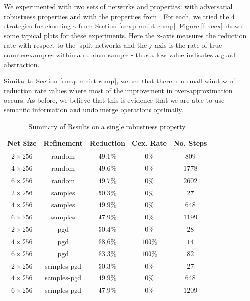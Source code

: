 We experimented with two sets of networks and properties: \mnist with
adversarial robustness properties and \acasxu with the properties from
\cite{reluplex}. For each, we tried the 4 strategies for choosing $\gamma$ from
Section \ref{s:exp-mnist-comp}.
Figure \ref{f:ncex} shows some typical plots
for these experiments. Here the x-axis measures the reduction rate with respect
to the \inc-\dec split networks and the y-axis is the rate of true
counterexamples within a random sample - thus a low value indicates a good
abstraction.

Similar to Section \ref{s:exp-mnist-comp}, we see that there is a small window
of reduction rate values where most of the improvement in over-approximation
occurs. As before, we believe that this is evidence that we are able to use
semantic information and undo merge operations optimally.

\begin{table}
\begin{tabular}{|c|c|c|c|c|}
    \hline
    Net Size     & Refinement  & Reduction & Cex. Rate & No. Steps \\
    \hline
    $2\times256$ & random      & $49.1\%$  & $  0\%$  & $ 809$    \\
    $4\times256$ & random      & $49.6\%$  & $  0\%$  & $1778$    \\
    $6\times256$ & random      & $49.7\%$  & $  0\%$  & $2602$    \\
    $2\times256$ & samples     & $50.3\%$  & $  0\%$  & $  27$    \\
    $4\times256$ & samples     & $49.9\%$  & $  0\%$  & $ 648$    \\
    $6\times256$ & samples     & $47.9\%$  & $  0\%$  & $1199$    \\
    $2\times256$ & pgd         & $50.4\%$  & $  0\%$  & $  28$    \\
    $4\times256$ & pgd         & $88.6\%$  & $100\%$  & $  14$    \\
    $6\times256$ & pgd         & $83.3\%$  & $100\%$  & $  82$    \\
    $2\times256$ & samples-pgd & $50.3\%$  & $  0\%$  & $  27$    \\
    $4\times256$ & samples-pgd & $49.9\%$  & $  0\%$  & $ 648$    \\
    $6\times256$ & samples-pgd & $47.9\%$  & $  0\%$  & $1209$    \\
    \hline
\end{tabular}
\caption{Summary of \mnist Results on a single robustness property }
\label{t:mnist-prop-summary}
\end{table}

